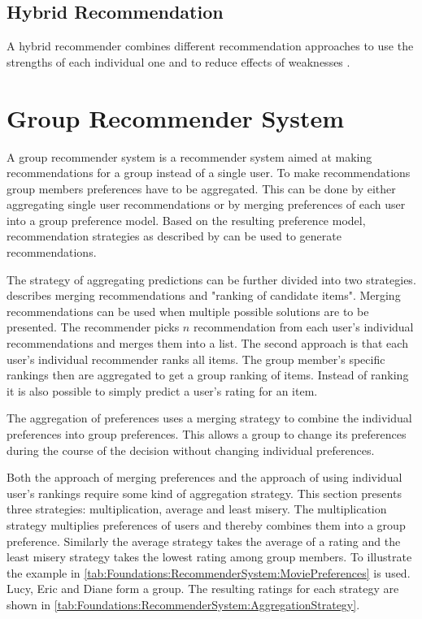 \subsection{Hybrid Recommendation}
A hybrid recommender combines different recommendation approaches to use the strengths of each individual one and to reduce effects of weaknesses \cite{burkeHybridRecommenderSystems2002}.

\section{Group Recommender System}
\label{sec:Foundations:GroupRecommenderSystem}

A group recommender system is a recommender system aimed at making recommendations for a group instead of a single user. To make recommendations group members preferences have to be aggregated. This can be done by either aggregating single user recommendations or by merging preferences of each user into a group preference model. Based on the resulting preference model, recommendation strategies as described by \citeauthor{jamesonRecommendationGroups2007} \cite{jamesonRecommendationGroups2007} can be used to generate recommendations.

The strategy of aggregating predictions can be further divided into two strategies. \citeauthor{felfernigAlgorithmsGroupRecommendation2018} \cite{felfernigAlgorithmsGroupRecommendation2018} describes merging recommendations and "ranking of candidate items". Merging recommendations can be used when multiple possible solutions are to be presented. The recommender picks $n$ recommendation from each user's individual recommendations and merges them into a list. The second approach is that each user's individual recommender ranks all items. The group member's specific rankings then are aggregated to get a group ranking of items. Instead of ranking it is also possible to simply predict a user's rating for an item.

The aggregation of preferences uses a merging strategy to combine the individual preferences into group preferences. This allows a group to change its preferences during the course of the decision without changing individual preferences.

Both the approach of merging preferences and the approach of using individual user's rankings require some kind of aggregation strategy. This section presents three strategies: multiplication, average and least misery. The multiplication strategy multiplies preferences of users and thereby combines them into a group preference. Similarly the average strategy takes the average of a rating and the least misery strategy takes the lowest rating among group members. To illustrate the example in \autoref{tab:Foundations:RecommenderSystem:MoviePreferences} is used. Lucy, Eric and Diane form a group. The resulting ratings for each strategy are shown in \autoref{tab:Foundations:RecommenderSystem:AggregationStrategy}.

